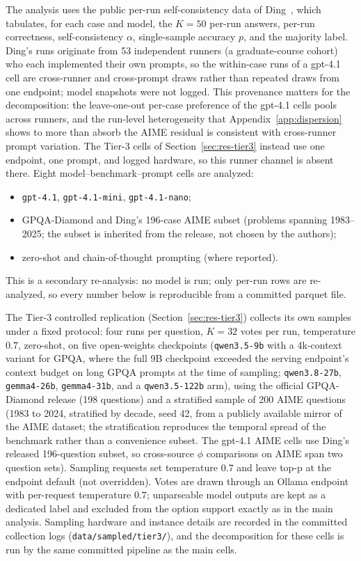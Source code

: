 \documentclass[a4paper,fleqn]{cas-sc}
\begin{document}
The analysis uses the public per-run self-consistency data of Ding~\cite{ding2026auditing}, which tabulates, for each case and model,
the $K=50$ per-run answers, per-run correctness, self-consistency $\alpha$, single-sample accuracy $p$, and the majority label.
Ding's runs originate from 53 independent runners (a graduate-course cohort) who each implemented their own prompts, so the within-case runs of a gpt-4.1 cell are cross-runner and cross-prompt draws rather than repeated draws from one endpoint; model snapshots were not logged. This provenance matters for the decomposition: the leave-one-out per-case preference of the gpt-4.1 cells pools across runners, and the run-level heterogeneity that Appendix~\ref{app:dispersion} shows to more than absorb the AIME residual is consistent with cross-runner prompt variation. The Tier-3 cells of Section~\ref{sec:res-tier3} instead use one endpoint, one prompt, and logged hardware, so this runner channel is absent there. Eight model--benchmark--prompt cells are analyzed:
\begin{itemize}
\item \texttt{gpt-4.1}, \texttt{gpt-4.1-mini}, \texttt{gpt-4.1-nano};
\item GPQA-Diamond and Ding's 196-case AIME subset (problems spanning
  1983--2025; the subset is inherited from the release, not chosen by the authors);
\item zero-shot and chain-of-thought prompting (where reported).
\end{itemize}
This is a secondary re-analysis: no model is run; only per-run rows are re-analyzed, so every number below is reproducible from a
committed parquet file.

The Tier-3 controlled replication (Section~\ref{sec:res-tier3})
collects its own samples under a fixed protocol: four runs per question,
$K=32$ votes per run, temperature $0.7$, zero-shot, on five
open-weights checkpoints (\texttt{qwen3.5-9b} with a 4k-context variant for
GPQA, where the full 9B checkpoint exceeded the serving endpoint's
context budget on long GPQA prompts at the time of sampling;
\texttt{qwen3.8-27b}, \texttt{gemma4-26b}, \texttt{gemma4-31b},
and a \texttt{qwen3.5-122b} arm), using the official GPQA-Diamond release
(198 questions) and a stratified sample of 200 AIME questions (1983 to
2024, stratified by decade, seed 42, from a publicly available mirror of the AIME
dataset; the stratification reproduces the temporal spread of the
benchmark rather than a convenience subset. The gpt-4.1 AIME cells use
Ding's released 196-question subset, so cross-source $\phi$ comparisons
on AIME span two question sets).
Sampling requests set temperature $0.7$ and leave top-p at the
endpoint default (not overridden). Votes are drawn through an
Ollama endpoint with per-request temperature $0.7$; unparseable model
outputs are kept as a dedicated label and excluded from the option
support exactly as in the main analysis. Sampling hardware and instance
details are recorded in the committed collection logs
(\texttt{data/sampled/tier3/}), and the decomposition for these cells is
run by the same committed pipeline as the main cells.
\end{document}
